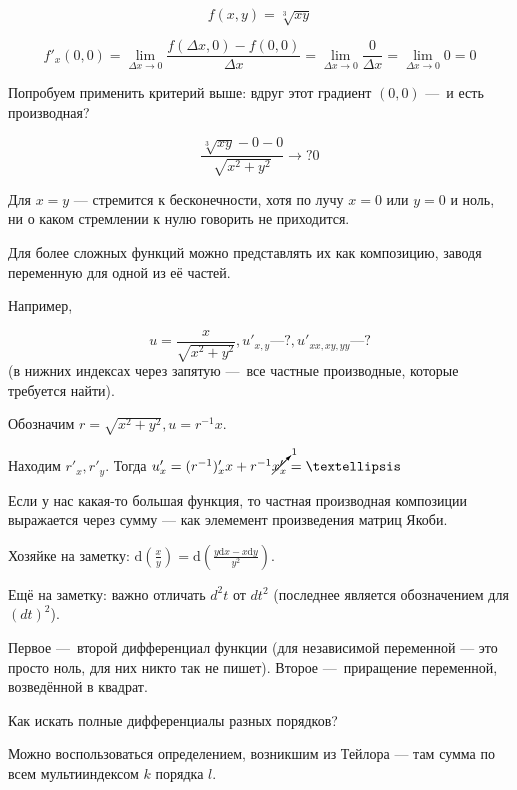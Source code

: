 \documentclass[12pt, a4paper]{article}
\begin{document}
\begin{equation}
  f(x, y) = \sqrt[3]{xy}
\end{equation}

\begin{equation}
  f'_x(0, 0) = \lim_{\Delta x → 0} \frac{f(\Delta x, 0) - f(0, 0)}{\Delta x} = \lim_{\Delta x → 0} \frac{0}{\Delta x} = \lim_{\Delta x → 0} 0 = 0
\end{equation}

Попробуем применить критерий выше: вдруг этот градиент $(0, 0)$ — и есть производная?

\begin{equation}
  \frac{\sqrt[3]{xy} - 0 - 0}{\sqrt{x^2 + y^2}} →? 0
\end{equation}

Для $x = y$ — стремится к бесконечности, хотя по лучу $x = 0$ или $y = 0$ и ноль, ни о каком стремлении к нулю говорить не приходится.

Для более сложных функций можно представлять их как композицию, заводя переменную для одной из её частей.

Например,

\begin{equation}
  u = \frac{x}{\sqrt{x^2 + y^2}}, u'_{x, y} — ?, u'_{xx, xy, yy} — ?
\end{equation}
(в нижних индексах через запятую — все частные производные, которые требуется найти).

Обозначим $r = \sqrt{x^2 + y^2}, u = r^{-1} x$.

Находим $r'_{x}, r'_{y}$. Тогда $u'_x = (r^{-1})'_x x + r^{-1} \cancelto{1}{x'_x} = …$


Если у нас какая-то большая функция, то частная производная композиции выражается через сумму 
— как элемемент произведения матриц Якоби.

Хозяйке на заметку: $\mathrm{d}\left(\frac{x}{y}\right) = \mathrm{d}\left(\frac{y\mathrm{d}x - x\mathrm{d}y}{y^2}\right)$.

Ещё на заметку: важно отличать $d^2t$ от $dt^2$ (последнее является обозначением для $(dt)^2$).

Первое — второй дифференциал функции (для независимой переменной — это просто ноль, для них никто так не пишет).
Второе — приращение переменной, возведённой в квадрат.

Как искать полные дифференциалы разных порядков?

Можно воспользоваться определением, возникшим из Тейлора — там сумма по всем мультииндексом $k$ порядка $l$.
\end{document}
